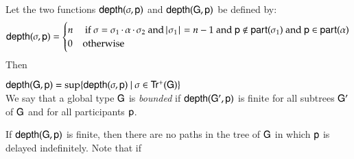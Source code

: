  \begin{definition}\label{depth}$\;$\\
 Let the two functions ${\sf depth}(\sigma,{\sf p})$ and ${\sf depth}({\sf G},{\sf p})$ be defined by:
\[{\sf depth}(\sigma,{\sf p})=\begin{cases} n &\text{ if }\sigma =
\sigma_1\,{\cdot}\,\alpha\,{\cdot}\,\sigma_2\text { and }\!\!~|~\! \sigma_1\!~|~\! = n-1\text { and }{\sf p} \notin
{\sf part}(\sigma_1)\text { and }{\sf p} \in {\sf part}(\alpha)\\
  0   & \text{otherwise }
\end{cases}
\]
Then

$\weight(\G,\pp)=
       \sup  \{\weight(\comseq,\pp)\ |\ \comseq\in\FPaths{\G}\}$\\
    
We say that a global type ${{\sf G}}$ is {\em bounded}
   if ${\sf depth}({\sf G}',{\sf p})$ is finite for all subtrees ${\sf G}'$ of ${{\sf G}}$ and
   for all participants ${\sf p}$.
 \end{definition}
If ${\sf depth}({\sf G},{\sf p})$ is finite, then there are  no paths in
the tree of ${\sf G}$ in which ${\sf p}$ is delayed indefinitely. 
Note that if  
